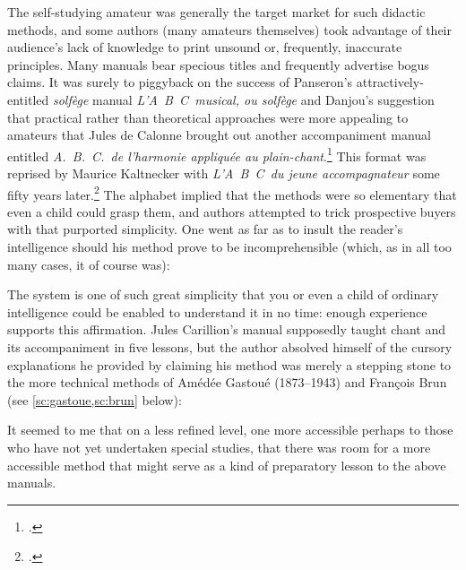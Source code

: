 The self-studying amateur was generally the target market for such didactic methods, and some authors (many amateurs themselves) took advantage of their audience's lack of knowledge to print unsound or, frequently, inaccurate principles.
Many manuals bear specious titles and frequently advertise bogus claims.
%
It was surely to piggyback on the success of Panseron's attractively-entitled \emph{solfège} manual \textit{L'A~B~C~musical, ou solfège} and Danjou's suggestion that practical rather than theoretical approaches were more appealing to amateurs that Jules de Calonne brought out another accompaniment manual entitled \textit{A.~B.~C.~de l'harmonie appliquée au plain-chant}.\footcites[218]{DanjouExamendiversesmethodes1845}[1]{Calonneharmonieappliqueeau1892}
This format was reprised by Maurice Kaltnecker with \textit{L'A~B~C~du jeune accompagnateur} some fifty years later.\footnote{\cite{Kaltneckerjeuneaccompagnateur1937}.}
The alphabet implied that the methods were so elementary that even a child could grasp them, and authors attempted to trick prospective buyers with that purported simplicity.
One went as far as to insult the reader's intelligence should his method prove to be incomprehensible (which, as in all too many cases, it of course was):
\noclub[2]

  {\cite[1]{GodardTraiteelementaireharmonie1851}}
{The system is one of such great simplicity that you or even a child of ordinary intelligence could be enabled to understand it in no time: enough experience supports this affirmation.}
\noindent
Jules Carillion's manual supposedly taught chant and its accompaniment in five lessons, but the author absolved himself of the cursory explanations he provided by claiming his method was merely a stepping stone to the more technical methods of Amédée Gastoué (1873--1943) and François Brun (see \cref{sc:gastoue,sc:brun} below):

  {\cite[5]{Carillionaccompagnementchantgregorien1916}}
{It seemed to me that on a less refined level, one more accessible perhaps to those who have not yet undertaken special studies, that there was room for a more accessible method that might serve as a kind of preparatory lesson to the above manuals.}

